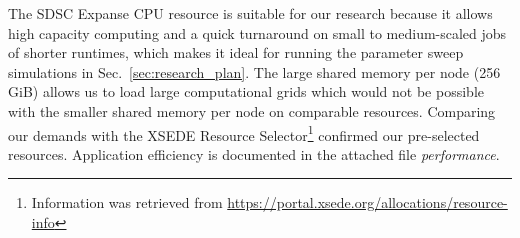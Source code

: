 {The SDSC Expanse CPU resource is suitable for our research because it allows high capacity computing and a quick turnaround on small to medium-scaled jobs of shorter runtimes, which makes it ideal for running the parameter sweep simulations in Sec.~\ref{sec:research_plan}. The large shared memory per node (256 GiB) allows us to load large computational grids which would not be possible with the smaller shared memory per node on comparable resources. Comparing our demands with the XSEDE Resource Selector\footnote{Information was 
retrieved from \url{https://portal.xsede.org/allocations/resource-info}} confirmed our pre-selected resources. Application efficiency is documented in the attached file \textit{performance}.
}

